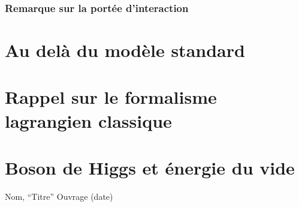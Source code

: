 \documentclass{article}
\begin{document}
				\subsubsection{Remarque sur la portée d'interaction}
		
		
		
		\section{Au delà du modèle standard}
		
		
		\begin{appendices}
			\section{Rappel sur le formalisme lagrangien classique}
			\section{Boson de Higgs et énergie du vide}
		\end{appendices}
		
		\begin{thebibliography}{4}
			Nom,
			``Titre''
			Ouvrage (date) 
			

			\end{thebibliography}
	
\end{document}

